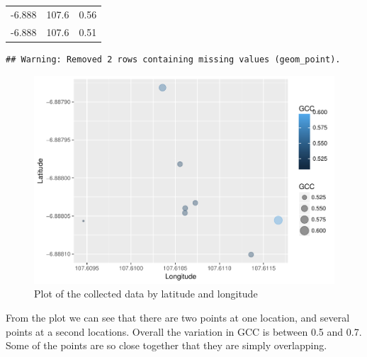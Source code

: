 \documentclass[]{elsarticle} %
\makeatletter
\def\maxwidth{\ifdim\Gin@nat@width>\linewidth\linewidth
\else\Gin@nat@width\fi}
\let\Oldincludegraphics\includegraphics
\renewcommand{\includegraphics}[1]{\Oldincludegraphics[width=\maxwidth]{#1}}
\makeatother
\begin{document}
\begin{longtable}[]{@{}ccc@{}}
\begin{minipage}[t]{0.14\columnwidth}
-6.888\strut
\end{minipage} & \begin{minipage}[t]{0.15\columnwidth}\centering\strut
107.6\strut
\end{minipage} & \begin{minipage}[t]{0.08\columnwidth}\centering\strut
0.56\strut
\end{minipage}\tabularnewline
\begin{minipage}[t]{0.14\columnwidth}\centering\strut
-6.888\strut
\end{minipage} & \begin{minipage}[t]{0.15\columnwidth}\centering\strut
107.6\strut
\end{minipage} & \begin{minipage}[t]{0.08\columnwidth}\centering\strut
0.51\strut
\end{minipage}\tabularnewline
\bottomrule
\end{longtable}

\begin{verbatim}
## Warning: Removed 2 rows containing missing values (geom_point).
\end{verbatim}

\begin{figure}
\centering
\includegraphics{DraftPaper_GCC_CitizenScience_files/figure-latex/plot_data-1.pdf}
\caption{Plot of the collected data by latitude and longitude}
\end{figure}

From the plot we can see that there are two points at one location, and
several points at a second locations. Overall the variation in GCC is
between 0.5 and 0.7. Some of the points are so close together that they
are simply overlapping.
\end{document}
